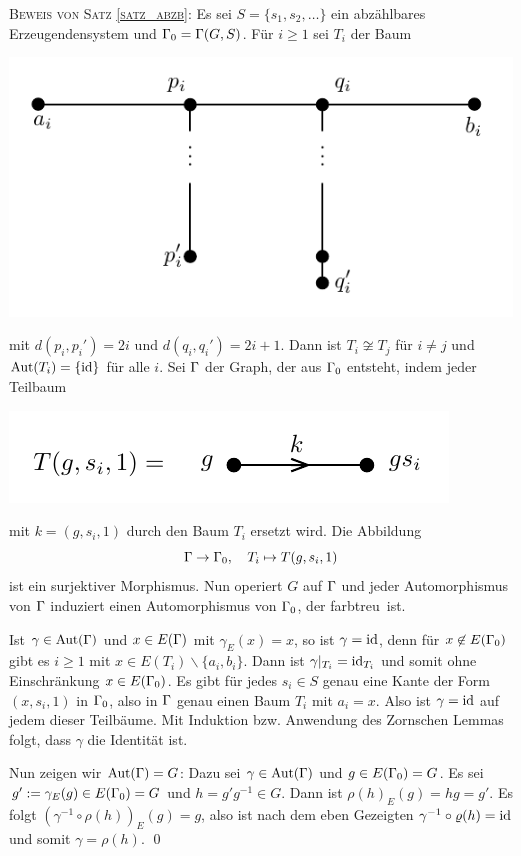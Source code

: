 \documentclass[a4paper, 12pt, twoside]{article}
\begin{document}
\textsc{Beweis von Satz \ref{satz_abzb}:}
Es sei $S=\{s_1, s_2, \ldots\}$ ein abzählbares Erzeugendensystem
und $\Gamma_0=\Gamma(G,S)$.
Für $i\geq 1$ sei $T_i$ der Baum
\begin{center}
	\includegraphics{grugraImages/Ti}
\end{center}
mit $d(p_i,p_i')=2i$ und $d(q_i,q_i')=2i+1$.
Dann ist $T_i\not\cong T_j$ für $i\neq j$ und $\mathrm{Aut}(T_i)=\{\mathrm{id}\}$
für alle $i$. Sei $\Gamma$ der Graph, der aus $\Gamma_0$ entsteht, indem
jeder Teilbaum
\begin{center}
	\includegraphics{grugraImages/ggsi}
\end{center}
mit $k=(g,s_i,1)$ durch den Baum $T_i$ ersetzt wird.
Die Abbildung
\[
\Gamma\rightarrow\Gamma_0,\quad T_i\mapsto T(g,s_i,1)
\]
ist ein surjektiver Morphismus.
Nun operiert $G$ auf $\Gamma$ und jeder Automorphismus von $\Gamma$
induziert einen Automorphismus von $\Gamma_0$, der \glqq farbtreu\grqq\
ist.

Ist $\gamma\in\mathrm{Aut}(\Gamma)$ und $x\in E(\Gamma)$ mit $\gamma_E(x)=x$,
so ist $\gamma=\mathrm{id}$, denn für $x\not\in E(\Gamma_0)$ gibt es $i\geq 1$
mit $x\in E(T_i)\backslash\{a_i,b_i\}$.
Dann ist $\gamma|_{T_i}=\mathrm{id}_{T_i}$ und somit ohne Einschränkung
$x\in E(\Gamma_0)$. Es gibt für jedes $s_i\in S$ genau eine Kante der
Form $(x,s_i,1)$ in $\Gamma_0$, also in $\Gamma$ genau einen Baum $T_i$
mit $a_i=x$. Also ist $\gamma=\mathrm{id}$ auf jedem dieser Teilbäume.
Mit Induktion bzw. Anwendung des Zornschen Lemmas folgt, dass
$\gamma$ die Identität ist.

Nun zeigen wir $\mathrm{Aut}(\Gamma)=G$: Dazu sei $\gamma\in\mathrm{Aut}(\Gamma)$ und
$g\in E(\Gamma_0)=G$. Es sei $g':=\gamma_E(g)\in E(\Gamma_0)=G$
und $h=g'g^{-1}\in G$. Dann ist $\rho(h)_E(g)=hg=g'$.
Es folgt $(\gamma^{-1}\circ\rho(h))_E(g)=g$, also
ist nach dem eben Gezeigten $\gamma^{-1}\circ\varrho(h)=\mathrm{id}$ und somit
$\gamma=\rho(h)$.
\qed
\end{document}
